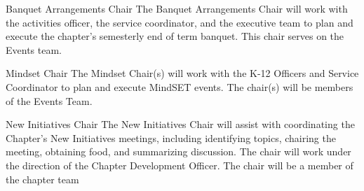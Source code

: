 \begin{enumsubsection}
\item{Banquet Arrangements Chair} The Banquet Arrangements Chair will work with the activities officer, the  service coordinator, and the executive team to plan and execute the chapter's semesterly end of term banquet. This chair serves on the Events team.

\item{Mindset Chair} The Mindset Chair(s) will work with the K-12 Officers and Service Coordinator to plan and execute MindSET events.  The chair(s) will be members of the Events Team.


\item{New Initiatives Chair} The New Initiatives Chair will assist with coordinating the Chapter’s New Initiatives meetings, including identifying topics, chairing the meeting, obtaining food, and summarizing discussion. The chair will work under the direction of the Chapter Development Officer. The chair will be a member of the chapter team  %





\end{enumsubsection}
